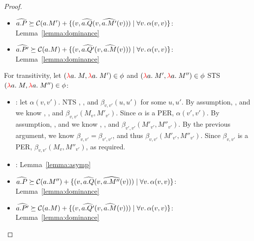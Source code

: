 \begin{proof}
\begin{enumerate}
\begin{itemize}
\begin{enumerate}
\begin{itemize}
        \item $\widehat{a.P} \succeq \cost{a.M'} + \{(v, \widehat{a.Q}(v,\widehat{a.M'}(v))) \mid \forall v.\, \alpha(v,v)\}$: Lemma~\ref{lemma:dominance}
        \item $\widehat{a.P'} \succeq \cost{a.M} + \{(v, \widehat{a.Q'}(v,\widehat{a.M}(v))) \mid \forall v.\, \alpha(v,v)\}$: Lemma~\ref{lemma:dominance}
      \end{itemize}
      For transitivity, let $(\lam{a}{\_}{M}, \lam{a}{}{M'}) \in \phi$ and 
      $(\lam{a}{\_}{M'}, \lam{a}{}{M''}) \in \phi$ 
      STS $(\lam{a}{\_}{M}, \lam{a}{}{M''}) \in \phi$:
      \begin{itemize}
        \item {}: let $\alpha(v,v')$. NTS 
        , , and $\beta_{v,v'}(u,u')$ for some $u,u'$. 
        By assumption, , and we know 
          , , and $\beta_{v,v'}(M_v,M'_{v'})$.
          Since $\alpha$ is a PER, $\alpha(v',v')$. 
          By assumption, , and we know
          , , and $\beta_{v',v'}(M'_{v'},M''_{v'})$.
          By the previous argument, we know $\beta_{v,v'} = \beta_{v',v'}$, and thus
          $\beta_{v,v'}(M'_{v'},M''_{v'})$.
          Since $\beta_{v,v'}$ is a PER, $\beta_{v,v'}(M_{v},M''_{v'})$, as required.
        \item {}: Lemma~\ref{lemma:asymp}
        \item $\widehat{a.P} \succeq \cost{a.M''} + \{(v, \widehat{a.Q}(v,\widehat{a.M''}(v))) \mid \forall v.\, \alpha(v,v)\}$: Lemma~\ref{lemma:dominance}
        \item $\widehat{a.P'} \succeq \cost{a.M} + \{(v, \widehat{a.Q'}(v,\widehat{a.M}(v))) \mid \forall v.\, \alpha(v,v)\}$: Lemma~\ref{lemma:dominance}
      \end{itemize}


\end{enumerate}
\end{itemize}
\end{enumerate}
\end{proof}

